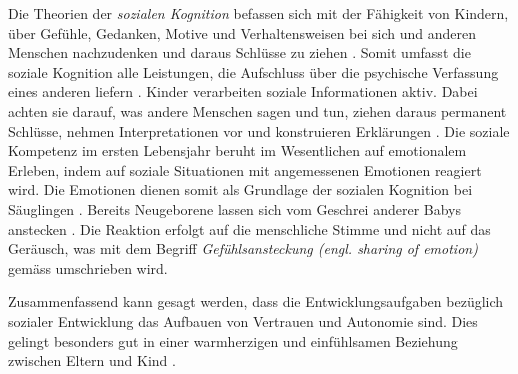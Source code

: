 Die Theorien der \textit{sozialen Kognition} befassen sich mit der Fähigkeit von Kindern, über Gefühle, Gedanken, Motive und Verhaltensweisen bei sich und anderen Menschen nachzudenken und daraus Schlüsse zu ziehen \cite[S.~486 ff.]{Siegler2008}. Somit umfasst die soziale Kognition alle Leistungen, die Aufschluss über die psychische Verfassung eines anderen liefern \cite[S.~237 ff.]{Bischof2011}. Kinder verarbeiten soziale Informationen aktiv. Dabei achten sie darauf, was andere Menschen sagen und tun, ziehen daraus permanent Schlüsse, nehmen Interpretationen vor und konstruieren Erklärungen \cite{Siegler2008}. Die soziale Kompetenz im ersten Lebensjahr beruht im Wesentlichen auf emotionalem Erleben, indem auf soziale Situationen mit angemessenen Emotionen reagiert wird. Die Emotionen dienen somit als Grundlage der sozialen Kognition bei Säuglingen \cite{Bischof2011}. Bereits Neugeborene lassen sich vom Geschrei anderer Babys anstecken \cite{Simner1971}. Die Reaktion erfolgt auf die menschliche Stimme und nicht auf das Geräusch, was mit dem Begriff \textit{Gefühlsansteckung (engl. sharing of emotion)} gemäss  umschrieben wird.

Zusammenfassend kann gesagt werden, dass die Entwicklungsaufgaben bezüglich sozialer Entwicklung das Aufbauen von Vertrauen und Autonomie sind. Dies gelingt besonders gut in einer warmherzigen und einfühlsamen Beziehung zwischen Eltern und Kind \cite[S.~224]{Berk2011}.

